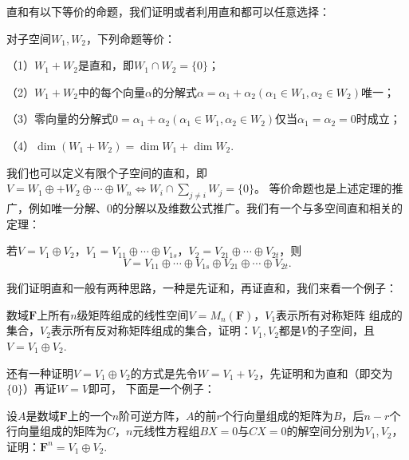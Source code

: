 直和有以下等价的命题，我们证明或者利用直和都可以任意选择：
\begin{theorem}
	对子空间$W_1,W_2$，下列命题等价：

	\textup{（1）}$W_1+W_2$是直和，即$W_1 \cap W_2=\{0\}$；

	\textup{（2）}$W_1+W_2$中的每个向量$\alpha$的分解式$\alpha=\alpha_1+\alpha_2(\alpha_1\in W_1,\alpha_2\in W_2)$唯一；

	\textup{（3）}零向量的分解式$0=\alpha_1+\alpha_2(\alpha_1\in W_1,\alpha_2\in W_2)$仅当$\alpha_1=\alpha_2=0$时成立；

	\textup{（4）}$\dim (W_1+W_2)=\dim W_1+\dim W_2$.
\end{theorem}
我们也可以定义有限个子空间的直和，即$V=W_1\oplus+W_2\oplus\cdots\oplus W_n \iff W_i \cap \sum\limits_{j \neq i}W_j=\{0\}$。
等价命题也是上述定理的推广，例如唯一分解、0的分解以及维数公式推广。我们有一个与多空间直和相关的定理：
\begin{theorem}
	若$V=V_1\oplus V_2$，$V_1=V_{11}\oplus\cdots\oplus V_{1s}$，$V_2=V_{21}\oplus\cdots\oplus V_{2t}$，则
	$$V=V_{11}\oplus\cdots\oplus V_{1s}\oplus V_{21}\oplus\cdots\oplus V_{2t}.$$
\end{theorem}
我们证明直和一般有两种思路，一种是先证和，再证直和，我们来看一个例子：
\begin{example}
	数域$\mathbf{F}$上所有$n$级矩阵组成的线性空间$V=M_n(\mathbf{F})$，$V_1$表示所有对称矩阵
	组成的集合，$V_2$表示所有反对称矩阵组成的集合，证明：$V_1,V_2$都是$V$的子空间，且$V=V_1\oplus V_2$.
\end{example}
还有一种证明$V=V_1\oplus V_2$的方式是先令$W=V_1+V_2$，先证明和为直和（即交为$\{0\}$）再证$W=V$即可，
下面是一个例子：
\begin{example}
	设$A$是数域$\mathbf{F}$上的一个$n$阶可逆方阵，$A$的前$r$个行向量组成的矩阵为$B$，后$n-r$个
	行向量组成的矩阵为$C$，$n$元线性方程组$BX=0$与$CX=0$的解空间分别为$V_1,V_2$，证明：$\mathbf{F}^n=V_1\oplus V_2$.
\end{example}
